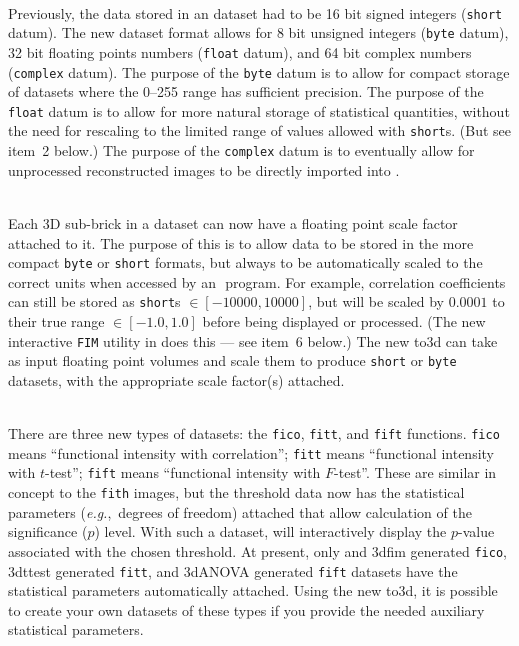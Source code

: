 \begin{description}\vspace*{-2.2ex}
  \item[\blob 1. Atomic Datum Types] \blob\\
    Previously, the data stored in an \afnit dataset had to be 16 bit
      signed integers ({\tt short} datum).
    The new dataset format allows for
      8 bit unsigned integers ({\tt byte} datum),
      32 bit floating points numbers ({\tt float} datum),
      and 64 bit complex numbers ({\tt complex} datum).
    The purpose of the
      {\tt byte} datum is to allow for compact storage of datasets
    where the 0--255 range has sufficient precision.
    The purpose of the {\tt float} datum is to allow for more natural storage
      of statistical quantities, without the need for rescaling to the
      limited range of values allowed with {\tt short}s.
    (But see item~2 below.)
    The purpose of the
      {\tt complex} datum is to eventually allow for unprocessed reconstructed
      images to be directly imported into \afni.

  \item[\blob 2. Scale Factors] \blob\\
    Each 3D sub-brick in a dataset can now have a floating point scale
    factor attached to it.  The purpose of this is to allow data to be
    stored in the more compact {\tt byte} or {\tt short} formats, but always to
    be automatically scaled to the correct units when accessed by an
    \MCW$\!$ \afnit program.  For example, correlation coefficients
    can still be stored as {\tt short}s ${\in} [-10000,10000]$, but will
    be scaled by $0.0001$ to their true range $\in [-1.0,1.0]$
    before being displayed or processed.  (The new interactive {\tt FIM}
    utility in \afnit does this --- see item~6 below.)  The new {\sf to3d} can
    take as input floating point volumes and scale them to produce
    {\tt short} or {\tt byte} datasets, with the appropriate scale
    factor(s) attached.

  \item[\blob 3. Auxiliary Statistical Data] \blob\\
    There are three new types of datasets: the {\tt fico}, {\tt fitt}, and {\tt fift}
    functions.  {\tt fico} means ``functional intensity with correlation'';
    {\tt fitt} means ``functional intensity with $t$-test'';
    {\tt fift} means ``functional intensity with $F$-test''.
    These are similar in concept to the {\tt fith} images, but the
    threshold data now has the statistical parameters ({\it e.g.},~degrees
    of freedom) attached that
    allow calculation of the significance ($p$) level.  With
    such a dataset, \afnit will interactively display the $p$-value
    associated with the chosen threshold.
    At present, only \afnit and {\sf 3dfim} generated {\tt fico},
    {\sf 3dttest} generated {\tt fitt},
    and {\sf 3dANOVA} generated {\tt fift} datasets have the
    statistical parameters automatically attached.  Using the new
    {\sf to3d}, it is possible to create your own datasets of these types
    if you provide the needed auxiliary statistical parameters.


\end{description}
